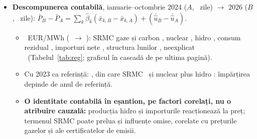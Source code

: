 \begin{itemize}
\begin{itemize}
  {$R^2=\NrTwo$; toți cei cinci coeficienți au semnul așteptat; fiecare EUR/MWh în plus la SRMC se asociază cu \NbSrmcS\ EUR/MWh la preț (eroarea standard HAC: \NseSrmc; grupată pe luni: \NseclSrmc). Cel mai mare factor de inflație a varianței (VIF): \NvifMax: factorii se suprapun.}
  \end{itemize}
\item {}%
{\textbf{Descompunerea contabilă}, ianuarie--octombrie 2024 ($A$, \NnA\ zile) $\to$ 2026 ($B$, \NnB\ zile): $\bar P_B-\bar P_A=\sum_k\hat\beta_k(\bar x_{k,B}-\bar x_{k,A})+(\bar{\hat u}_B-\bar{\hat u}_A)$.}
  \begin{itemize}
  \item {}%
  {\NdPS\ EUR/MWh (\NpA\ $\to$ \NpB): SRMC gaze și carbon \NcSrmcS, nuclear \NcNucS, hidro \NcHydroS, consum rezidual \NcResid, importuri nete \NcImp, structura lunilor \NcCal, neexplicat \NcUnexS\ (Tabelul~\ref{tab:reg}; graficul în cascadă de pe ultima pagină).}
  \item {}%
  {Cu 2023 ca referință: \NdPTTS, din care SRMC \NcSrmcTTS\ și nuclear plus hidro \NcSupplyTTS: împărțirea depinde de anul de referință.}
  \item {}%
  {\textbf{O identitate contabilă în eșantion, pe factori corelați, nu o atribuire cauzală:} producția hidro și importurile reacționează la preț; termenul SRMC poate prelua și influențe omise, corelate cu prețurile gazelor și ale certificatelor de emisii.}
  \end{itemize}
\end{itemize}
\begin{table}[!htb]\centering\small
\caption{%
{Regresia zilnică în eșantion a PZU (EUR/MWh) și descompunerea variației, ianuarie--octombrie 2024 $\to$ 2026 (*). Variabilele lunare și constanta nu sînt prezentate.}}\label{tab:reg}
\end{table}

